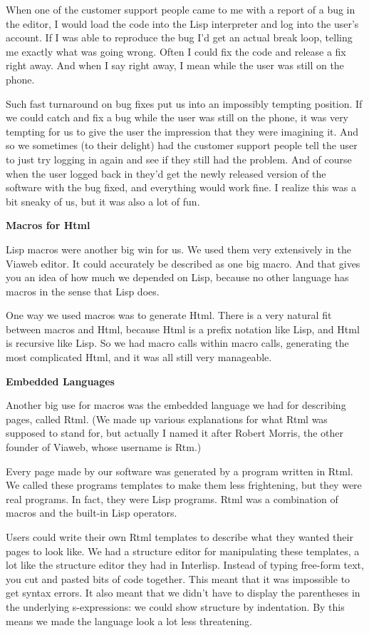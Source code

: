 \documentclass[12pt]{book}
\begin{document}
When one of the customer support people came to me with a report of a
bug in the editor, I would load the code into the Lisp interpreter and
log into the user's account. If I was able to reproduce the bug I'd get
an actual break loop, telling me exactly what was going wrong. Often I
could fix the code and release a fix right away. And when I say right
away, I mean while the user was still on the phone.

Such fast turnaround on bug fixes put us into an impossibly tempting
position. If we could catch and fix a bug while the user was still on
the phone, it was very tempting for us to give the user the impression
that they were imagining it. And so we sometimes (to their delight) had
the customer support people tell the user to just try logging in again
and see if they still had the problem. And of course when the user
logged back in they'd get the newly released version of the software
with the bug fixed, and everything would work fine. I realize this was a
bit sneaky of us, but it was also a lot of fun.

\textbf{Macros for Html}

Lisp macros were another big win for us. We used them very extensively
in the Viaweb editor. It could accurately be described as one big macro.
And that gives you an idea of how much we depended on Lisp, because no
other language has macros in the sense that Lisp does.

One way we used macros was to generate Html. There is a very natural fit
between macros and Html, because Html is a prefix notation like Lisp,
and Html is recursive like Lisp. So we had macro calls within macro
calls, generating the most complicated Html, and it was all still very
manageable.

\textbf{Embedded Languages}

Another big use for macros was the embedded language we had for
describing pages, called Rtml. (We made up various explanations for what
Rtml was supposed to stand for, but actually I named it after Robert
Morris, the other founder of Viaweb, whose username is Rtm.)

Every page made by our software was generated by a program written in
Rtml. We called these programs templates to make them less frightening,
but they were real programs. In fact, they were Lisp programs. Rtml was
a combination of macros and the built-in Lisp operators.

Users could write their own Rtml templates to describe what they wanted
their pages to look like. We had a structure editor for manipulating
these templates, a lot like the structure editor they had in Interlisp.
Instead of typing free-form text, you cut and pasted bits of code
together. This meant that it was impossible to get syntax errors. It
also meant that we didn't have to display the parentheses in the
underlying s-expressions: we could show structure by indentation. By
this means we made the language look a lot less threatening.
\end{document}
